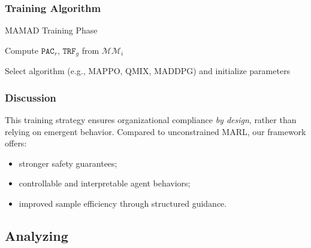 \documentclass[pdflatex,sn-mathphys-num]{sn-jnl}%
\theoremstyle{thmstyleone}%
\theoremstyle{thmstyletwo}%
\theoremstyle{thmstylethree}%
\begin{document}
\subsubsection*{Training Algorithm}

\begin{algorithm}[H]
    \caption{MAMAD Training Phase}
    \label{alg:training}
    \DontPrintSemicolon

    Compute $\texttt{PAC}_r$, $\texttt{TRF}_g$ from $\mathcal{MM}_i$

    Select algorithm (e.g., MAPPO, QMIX, MADDPG) and initialize parameters

\end{algorithm}

\subsubsection*{Discussion}

This training strategy ensures organizational compliance \textit{by design}, rather than relying on emergent behavior. Compared to unconstrained MARL, our framework offers:

\begin{itemize}
    \item stronger safety guarantees;
    \item controllable and interpretable agent behaviors;
    \item improved sample efficiency through structured guidance.
\end{itemize}

\subsection{Analyzing}
\end{document}
